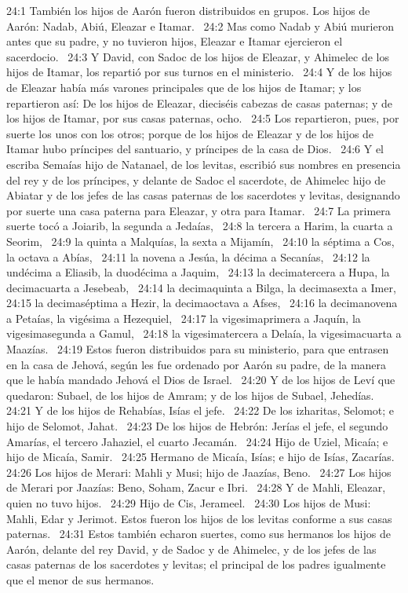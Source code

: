24:1 También los hijos de Aarón fueron distribuidos en grupos. Los hijos de Aarón: Nadab, Abiú, Eleazar e Itamar.  
24:2 Mas como Nadab y Abiú murieron antes que su padre, y no tuvieron hijos, Eleazar e Itamar ejercieron el sacerdocio.  
24:3 Y David, con Sadoc de los hijos de Eleazar, y Ahimelec de los hijos de Itamar, los repartió por sus turnos en el ministerio.  
24:4 Y de los hijos de Eleazar había más varones principales que de los hijos de Itamar; y los repartieron así: De los hijos de Eleazar, dieciséis cabezas de casas paternas; y de los hijos de Itamar, por sus casas paternas, ocho.  
24:5 Los repartieron, pues, por suerte los unos con los otros; porque de los hijos de Eleazar y de los hijos de Itamar hubo príncipes del santuario, y príncipes de la casa de Dios.  
24:6 Y el escriba Semaías hijo de Natanael, de los levitas, escribió sus nombres en presencia del rey y de los príncipes, y delante de Sadoc el sacerdote, de Ahimelec hijo de Abiatar y de los jefes de las casas paternas de los sacerdotes y levitas, designando por suerte una casa paterna para Eleazar, y otra para Itamar.  
24:7 La primera suerte tocó a Joiarib, la segunda a Jedaías,  
24:8 la tercera a Harim, la cuarta a Seorim,  
24:9 la quinta a Malquías, la sexta a Mijamín,  
24:10 la séptima a Cos, la octava a Abías,  
24:11 la novena a Jesúa, la décima a Secanías,  
24:12 la undécima a Eliasib, la duodécima a Jaquim,  
24:13 la decimatercera a Hupa, la decimacuarta a Jesebeab,  
24:14 la decimaquinta a Bilga, la decimasexta a Imer,  
24:15 la decimaséptima a Hezir, la decimaoctava a Afses,  
24:16 la decimanovena a Petaías, la vigésima a Hezequiel,  
24:17 la vigesimaprimera a Jaquín, la vigesimasegunda a Gamul,  
24:18 la vigesimatercera a Delaía, la vigesimacuarta a Maazías.  
24:19 Estos fueron distribuidos para su ministerio, para que entrasen en la casa de Jehová, según les fue ordenado por Aarón su padre, de la manera que le había mandado Jehová el Dios de Israel.  
24:20 Y de los hijos de Leví que quedaron: Subael, de los hijos de Amram; y de los hijos de Subael, Jehedías.  
24:21 Y de los hijos de Rehabías, Isías el jefe.  
24:22 De los izharitas, Selomot; e hijo de Selomot, Jahat.  
24:23 De los hijos de Hebrón: Jerías el jefe, el segundo Amarías, el tercero Jahaziel, el cuarto Jecamán.  
24:24 Hijo de Uziel, Micaía; e hijo de Micaía, Samir.  
24:25 Hermano de Micaía, Isías; e hijo de Isías, Zacarías.  
24:26 Los hijos de Merari: Mahli y Musi; hijo de Jaazías, Beno.  
24:27 Los hijos de Merari por Jaazías: Beno, Soham, Zacur e Ibri.  
24:28 Y de Mahli, Eleazar, quien no tuvo hijos.  
24:29 Hijo de Cis, Jerameel.  
24:30 Los hijos de Musi: Mahli, Edar y Jerimot. Estos fueron los hijos de los levitas conforme a sus casas paternas.  
24:31 Estos también echaron suertes, como sus hermanos los hijos de Aarón, delante del rey David, y de Sadoc y de Ahimelec, y de los jefes de las casas paternas de los sacerdotes y levitas; el principal de los padres igualmente que el menor de sus hermanos.  
